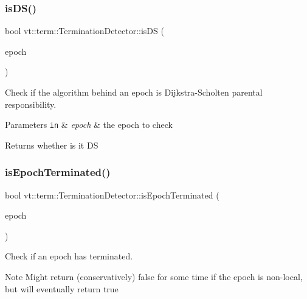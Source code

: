 \subsubsection{\texorpdfstring{is\+D\+S()}{isDS()}}
{\footnotesize\ttfamily bool vt\+::term\+::\+Termination\+Detector\+::is\+DS (\begin{DoxyParamCaption}\item[{\hyperlink{namespacevt_a81d11b28122d43bf9834577e4a06440f}{Epoch\+Type}}]{epoch }\end{DoxyParamCaption})\hspace{0.3cm}{\ttfamily [inline]}}



Check if the algorithm behind an epoch is Dijkstra-\/\+Scholten parental responsibility. 


\begin{DoxyParams}[1]{Parameters}
\mbox{\tt in}  & {\em epoch} & the epoch to check\\
\hline
\end{DoxyParams}
\begin{DoxyReturn}{Returns}
whether is it DS 
\end{DoxyReturn}
\mbox{\label{structvt_1_1term_1_1_termination_detector_a2c85d1d5316235e068433f4a3984a67e}} 
\subsubsection{\texorpdfstring{is\+Epoch\+Terminated()}{isEpochTerminated()}}
{\footnotesize\ttfamily bool vt\+::term\+::\+Termination\+Detector\+::is\+Epoch\+Terminated (\begin{DoxyParamCaption}\item[{\hyperlink{namespacevt_a81d11b28122d43bf9834577e4a06440f}{Epoch\+Type}}]{epoch }\end{DoxyParamCaption})}



Check if an epoch has terminated. 

\begin{DoxyNote}{Note}
Might return (conservatively) false for some time if the epoch is non-\/local, but will eventually return true
\end{DoxyNote}

